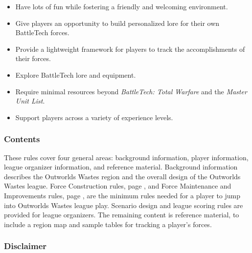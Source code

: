 \documentclass{article}
\begin{document}
\begin{itemize}

\item Have lots of fun while fostering a friendly and welcoming environment.

\item Give players an opportunity to build personalized lore for their own BattleTech forces.

\item Provide a lightweight framework for players to track the accomplishments of their forces.

\item Explore BattleTech lore and equipment.

\item Require minimal resources beyond \emph{BattleTech: Total Warfare} and the \emph{Master Unit List}.

\item Support players across a variety of experience levels.

\end{itemize}

\subsubsection*{Contents}

These rules cover four general areas: background information, player information, league organizer information, and reference material.
Background information describes the Outworlds Wastes region and the overall design of the Outworlds Wastes league.
Force Construction rules, page \pageref{subsec:force_construction}, and Force Maintenance and Improvements rules, page \pageref{subsec:force_maintenance}, are the minimum rules needed for a player to jump into Outworlds Wastes league play.
Scenario design and league scoring rules are provided for league organizers.
The remaining content is reference material, to include a region map and sample tables for tracking a player's forces.

\subsubsection*{Disclaimer}
\end{document}
